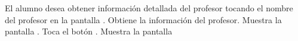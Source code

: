 \begin{UCtrayectoria}
    \UCpaso[\UCactor] El alumno desea obtener información detallada del profesor tocando el nombre del profesor en la pantalla .
    \UCpaso[\UCsist] Obtiene la información del profesor.
    \UCpaso[\UCsist] Muestra la pantalla .
    \UCpaso[\UCactor] Toca el botón .
    \UCpaso[\UCsist] Muestra la pantalla 
 \end{UCtrayectoria}

 
%
%
 